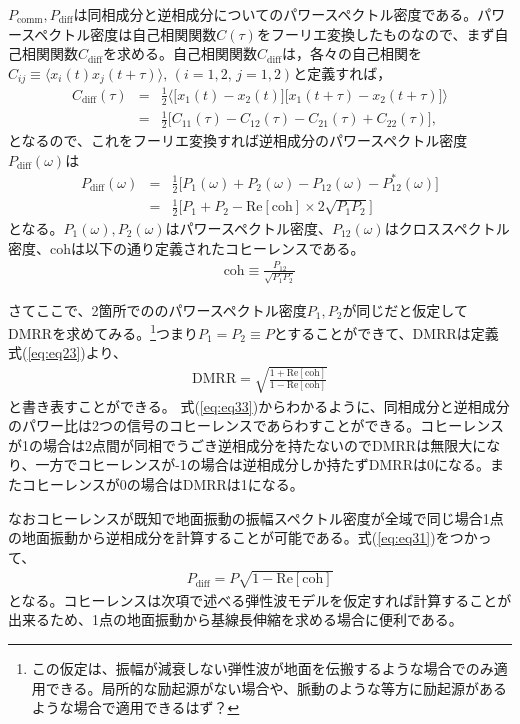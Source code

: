\documentclass[a4paper,12pt]{jsarticle}
\begin{document}
$P_{\mathrm{comm}},P_{\mathrm{diff}}$は同相成分と逆相成分についてのパワースペクトル密度である。パワースペクトル密度は自己相関関数$C(\tau)$をフーリエ変換したものなので、まず自己相関関数$C_{\mathrm{diff}}$を求める。自己相関関数$C_{\mathrm{diff}}$は，各々の自己相関を$ C_{ij} \equiv \langle x_{i}(t)x_{j}(t+\tau)\rangle,\, (i=1,2,\,j=1,2)$と定義すれば， 
\begin{eqnarray}
  C_{\mathrm{diff}}(\tau) &=& \frac{1}{2}
  \biggl\langle
  \biggl[ x_{1}(t)-x_{2}(t) \biggr] \biggl[ x_{1}(t+\tau)-x_{2}(t+\tau) \biggr]
  \biggr\rangle \\
  &=& \frac{1}{2}\biggl[ C_{11}(\tau) - C_{12}(\tau) - C_{21}(\tau) + C_{22}(\tau) \biggr], 
\end{eqnarray}
となるので、これをフーリエ変換すれば逆相成分のパワースペクトル密度$P_{\mathrm{diff}}(\omega)$は
\begin{eqnarray}
  P_{\mathrm{diff}}(\omega) &=& \frac{1}{2}\biggl[ P_{1}(\omega) + P_{2}(\omega) - P_{12}(\omega) - P_{12}^*(\omega) \biggr]\\
  &=& \frac{1}{2} \biggl[ P_{1}+P_{2} - \mathrm{Re}\left[\mathrm{coh} \right]\times2\sqrt{P_{1}P_{2}} \biggr] \label{eq:eq31}
\end{eqnarray}
となる。$P_{1}(\omega),P_{2}(\omega)$はパワースペクトル密度、$P_{12}(\omega)$はクロススペクトル密度、$\mathrm{coh}$は以下の通り定義されたコヒーレンスである。
\begin{eqnarray}
  \mathrm{coh} \equiv \frac{P_{12}}{\sqrt{P_{1}P_{2}}}
\end{eqnarray}


さてここで、2箇所でののパワースペクトル密度$P_{1},P_{2}$が同じだと仮定してDMRRを求めてみる。\footnote[3]{この仮定は、振幅が減衰しない弾性波が地面を伝搬するような場合でのみ適用できる。局所的な励起源がない場合や、脈動のような等方に励起源があるような場合で適用できるはず？}つまり$P_{1}=P_{2}\equiv P$とすることができて、$\mathrm{DMRR}$は定義式(\ref{eq:eq23})より、
\begin{eqnarray}
 \mathrm{DMRR} = \sqrt{\frac{1 + \mathrm{Re} \left[\mathrm{coh} \right] }{1 - \mathrm{Re} \left[\mathrm{coh} \right]}} \label{eq:eq33}
\end{eqnarray}
と書き表すことができる。
式(\ref{eq:eq33})からわかるように、同相成分と逆相成分のパワー比は2つの信号のコヒーレンスであらわすことができる。コヒーレンスが1の場合は2点間が同相でうごき逆相成分を持たないのでDMRRは無限大になり、一方でコヒーレンスが-1の場合は逆相成分しか持たずDMRRは0になる。またコヒーレンスが0の場合はDMRRは1になる。

なおコヒーレンスが既知で地面振動の振幅スペクトル密度が全域で同じ場合1点の地面振動から逆相成分を計算することが可能である。式(\ref{eq:eq31})をつかって、
\begin{eqnarray}
  P_\mathrm{diff} = P \sqrt{1 - \mathrm{Re[coh]}} \label{eq:eq34}
\end{eqnarray}
となる。コヒーレンスは次項で述べる弾性波モデルを仮定すれば計算することが出来るため、1点の地面振動から基線長伸縮を求める場合に便利である。
\end{document}
